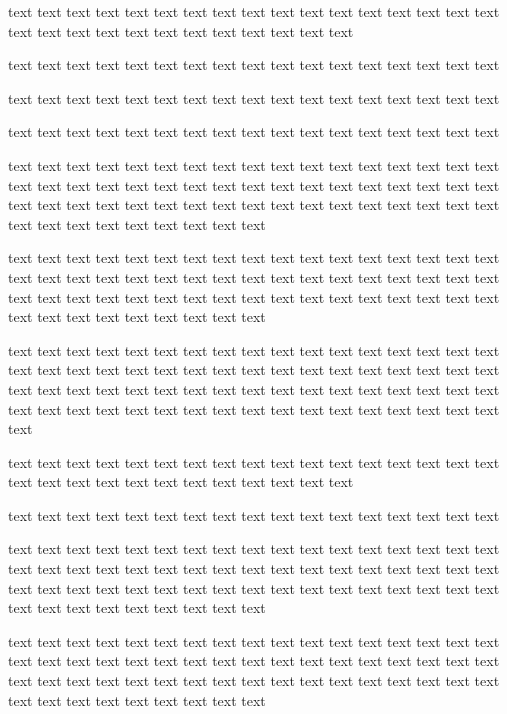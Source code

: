 \documentclass[twocolumn]{article}
\begin{document}
    text text text text text text text text text text text text text text text text text text text text text text text text text text text text text

    text text text text text text text text text text text text text text text text text

    text text text text text text text text text text text text text text text text text

    text text text text text text text text text text text text text text text text text

text text text text text text text text text text text text text text text text text text text text text text text text text text text text text text text text text text text text text text text text text text text text text text text text text text text text text text text text text text text text

    text text text text text text text text text text text text text text text text text text text text text text text text text text text text text text text text text text text text text text text text text text text text text text text text text text text text text text text text text text text text

    text text text text text text text text text text text text text text text text text text text text text text text text text text text text text text text text text text text text text text text text text text text text text text text text text text text text text text text text text text text text text text text text text text text text text

    text text text text text text text text text text text text text text text text text text text text text text text text text text text text text

    text text text text text text text text text text text text text text text text text


text text text text text text text text text text text text text text text text text text text text text text text text text text text text text text text text text text text text text text text text text text text text text text text text text text text text text text text text text text text text

    text text text text text text text text text text text text text text text text text text text text text text text text text text text text text text text text text text text text text text text text text text text text text text text text text text text text text text text text text text text text
\end{document}
